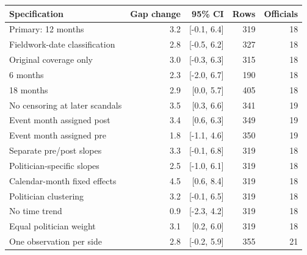 \begin{tabular}{lrrrr}
\toprule
Specification & Gap change & 95\% CI & Rows & Officials \\
\midrule
Primary: 12 months & 3.2 & [-0.1, 6.4] & 319 & 18 \\
Fieldwork-date classification & 2.8 & [-0.5, 6.2] & 327 & 18 \\
Original coverage only & 3.0 & [-0.3, 6.3] & 315 & 18 \\
6 months & 2.3 & [-2.0, 6.7] & 190 & 18 \\
18 months & 2.9 & [0.0, 5.7] & 405 & 18 \\
No censoring at later scandals & 3.5 & [0.3, 6.6] & 341 & 19 \\
Event month assigned post & 3.4 & [0.6, 6.3] & 349 & 19 \\
Event month assigned pre & 1.8 & [-1.1, 4.6] & 350 & 19 \\
Separate pre/post slopes & 3.3 & [-0.1, 6.8] & 319 & 18 \\
Politician-specific slopes & 2.5 & [-1.0, 6.1] & 319 & 18 \\
Calendar-month fixed effects & 4.5 & [0.6, 8.4] & 319 & 18 \\
Politician clustering & 3.2 & [-0.1, 6.5] & 319 & 18 \\
No time trend & 0.9 & [-2.3, 4.2] & 319 & 18 \\
Equal politician weight & 3.1 & [0.2, 6.0] & 319 & 18 \\
One observation per side & 2.8 & [-0.2, 5.9] & 355 & 21 \\
\bottomrule
\end{tabular}
